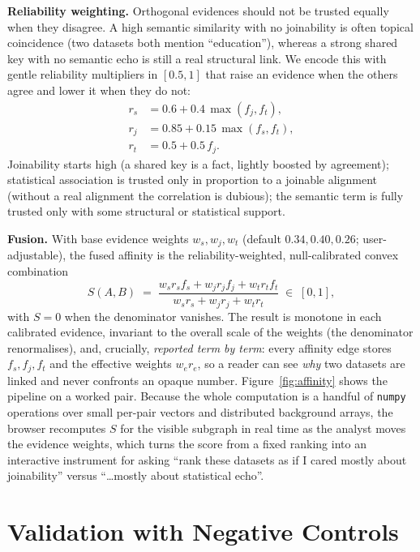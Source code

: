 \documentclass[journal]{IEEEtran}
\begin{document}
\textbf{Reliability weighting.} Orthogonal evidences should not be trusted equally when they disagree. A high
semantic similarity with no joinability is often topical coincidence (two datasets both mention ``education''),
whereas a strong shared key with no semantic echo is still a real structural link. We encode this with gentle
reliability multipliers in $[0.5,1]$ that raise an evidence when the others agree and lower it when they do not:
\begin{align}
r_s &= 0.6 + 0.4\,\max(f_j, f_t), \\
r_j &= 0.85 + 0.15\,\max(f_s, f_t), \\
r_t &= 0.5 + 0.5\,f_j .
\end{align}
Joinability starts high (a shared key is a fact, lightly boosted by agreement); statistical association is trusted
only in proportion to a joinable alignment (without a real alignment the correlation is dubious); the semantic
term is fully trusted only with some structural or statistical support.

\textbf{Fusion.} With base evidence weights $w_s,w_j,w_t$ (default $0.34,0.40,0.26$; user-adjustable), the fused
affinity is the reliability-weighted, null-calibrated convex combination
\begin{equation}
S(A,B) \;=\; \frac{w_s r_s f_s + w_j r_j f_j + w_t r_t f_t}{w_s r_s + w_j r_j + w_t r_t}\;\in\;[0,1],
\end{equation}
with $S=0$ when the denominator vanishes. The result is monotone in each calibrated evidence, invariant to the
overall scale of the weights (the denominator renormalises), and, crucially, \emph{reported term by term}: every
affinity edge stores $f_s,f_j,f_t$ and the effective weights $w_e r_e$, so a reader can see \emph{why} two
datasets are linked and never confronts an opaque number. Figure~\ref{fig:affinity} shows the pipeline on a
worked pair. Because the whole computation is a handful of \texttt{numpy} operations over small per-pair vectors
and distributed background arrays, the browser recomputes $S$ for the visible subgraph in real time as the analyst
moves the evidence weights, which turns the score from a fixed ranking into an interactive instrument for asking
``rank these datasets as if I cared mostly about joinability'' versus ``\dots mostly about statistical echo''.

\section{Validation with Negative Controls}\label{sec:validation}
\end{document}
